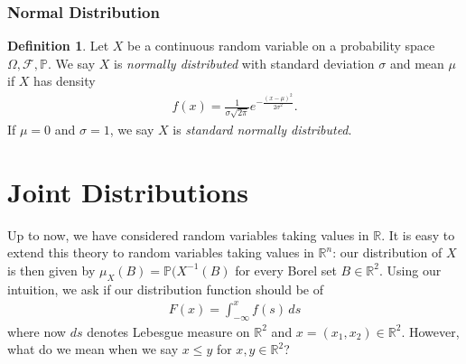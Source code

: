 \documentclass[12pt]{article}
\newcommand{\rr}{\mathbb{R}}
\newcommand{\filter}{\mathcal{F}}
\newcommand{\prob}{\mathbb{P}}
\theoremstyle{plain}
\theoremstyle{definition}
\newtheorem*{definition}{Definition}
\theoremstyle{remark}
\numberwithin{equation}{section}  %
\begin{document}
\subsubsection{Normal Distribution}
\begin{definition}
Let $X$ be a continuous random variable on a probability space $\Omega, \filter,
\prob$. We say $X$ is \emph{normally distributed} with standard deviation $\sigma$ and
mean $\mu$ if $X$ has density
\begin{align*}
f(x) = \frac{1}{\sigma \sqrt{2 \pi}} e^{ -\frac{(x - \mu)^2}{2 \sigma^2}}.
\end{align*}
If $\mu = 0$ and $\sigma =1$, we say $X$ is \emph{standard normally
distributed}.
\end{definition}
\section{Joint Distributions}
Up to now, we have considered random variables taking values in $\rr$.
It is easy to extend this theory to random variables taking values in $\rr^n$:
our distribution of $X$ is then given by $\mu_X(B) =
\prob(X^{-1}(B)$ for every Borel set $B \in
\rr^2$. Using our intuition, we ask if our distribution function should be of
\begin{align*}
F(x) = \int_{-\infty}^{x} f(s) \, ds
\end{align*}
where now $ds$ denotes Lebesgue measure on $\rr^2$ and $x = (x_1, x_2) \in
\rr^2$. However, what do we mean when we say $x \le y$ for $x, y \in \rr^2$? 
\end{document}
